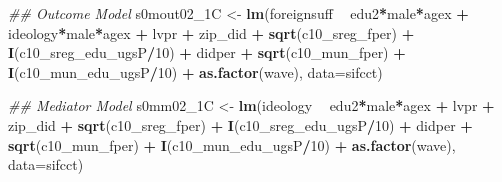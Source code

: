 \documentclass[
]{article}
\newenvironment{Shaded}{\begin{snugshade}}{\end{snugshade}}
\newcommand{\CommentTok}[1]{\textcolor[rgb]{0.56,0.35,0.01}{\textit{#1}}}
\newcommand{\DataTypeTok}[1]{\textcolor[rgb]{0.13,0.29,0.53}{#1}}
\newcommand{\DecValTok}[1]{\textcolor[rgb]{0.00,0.00,0.81}{#1}}
\newcommand{\KeywordTok}[1]{\textcolor[rgb]{0.13,0.29,0.53}{\textbf{#1}}}
\newcommand{\NormalTok}[1]{#1}
\newcommand{\OperatorTok}[1]{\textcolor[rgb]{0.81,0.36,0.00}{\textbf{#1}}}
\newcommand{\StringTok}[1]{\textcolor[rgb]{0.31,0.60,0.02}{#1}}
\begin{document}
\begin{Shaded}
\begin{Highlighting}[]
\CommentTok{## Outcome Model }
\NormalTok{s0mout02_1C <-}\StringTok{ }\KeywordTok{lm}\NormalTok{(foreignsuff  }\OperatorTok{~}\StringTok{ }\NormalTok{edu2}\OperatorTok{*}\NormalTok{male}\OperatorTok{*}\NormalTok{agex }\OperatorTok{+}\StringTok{ }\NormalTok{ideology}\OperatorTok{*}\NormalTok{male}\OperatorTok{*}\NormalTok{agex }\OperatorTok{+}\StringTok{ }\NormalTok{lvpr }\OperatorTok{+}\StringTok{  }
\StringTok{                    }\NormalTok{zip_did }\OperatorTok{+}\StringTok{ }\KeywordTok{sqrt}\NormalTok{(c10_sreg_fper) }\OperatorTok{+}\StringTok{ }\KeywordTok{I}\NormalTok{(c10_sreg_edu_ugsP}\OperatorTok{/}\DecValTok{10}\NormalTok{) }\OperatorTok{+}\StringTok{ }
\StringTok{                    }\NormalTok{didper }\OperatorTok{+}\StringTok{ }\KeywordTok{sqrt}\NormalTok{(c10_mun_fper) }\OperatorTok{+}\StringTok{ }\KeywordTok{I}\NormalTok{(c10_mun_edu_ugsP}\OperatorTok{/}\DecValTok{10}\NormalTok{) }\OperatorTok{+}\StringTok{ }
\StringTok{                    }\KeywordTok{as.factor}\NormalTok{(wave), }\DataTypeTok{data=}\NormalTok{sifcct)}

\CommentTok{## Mediator Model}
\NormalTok{s0mm02_1C <-}\StringTok{ }\KeywordTok{lm}\NormalTok{(ideology  }\OperatorTok{~}\StringTok{ }\NormalTok{edu2}\OperatorTok{*}\NormalTok{male}\OperatorTok{*}\NormalTok{agex }\OperatorTok{+}\StringTok{ }\NormalTok{lvpr }\OperatorTok{+}\StringTok{  }
\StringTok{                  }\NormalTok{zip_did }\OperatorTok{+}\StringTok{ }\KeywordTok{sqrt}\NormalTok{(c10_sreg_fper) }\OperatorTok{+}\StringTok{ }\KeywordTok{I}\NormalTok{(c10_sreg_edu_ugsP}\OperatorTok{/}\DecValTok{10}\NormalTok{) }\OperatorTok{+}\StringTok{ }
\StringTok{                  }\NormalTok{didper }\OperatorTok{+}\StringTok{ }\KeywordTok{sqrt}\NormalTok{(c10_mun_fper) }\OperatorTok{+}\StringTok{ }\KeywordTok{I}\NormalTok{(c10_mun_edu_ugsP}\OperatorTok{/}\DecValTok{10}\NormalTok{) }\OperatorTok{+}\StringTok{ }
\StringTok{                  }\KeywordTok{as.factor}\NormalTok{(wave), }\DataTypeTok{data=}\NormalTok{sifcct)}


\end{Highlighting}
\end{Shaded}
\end{document}
